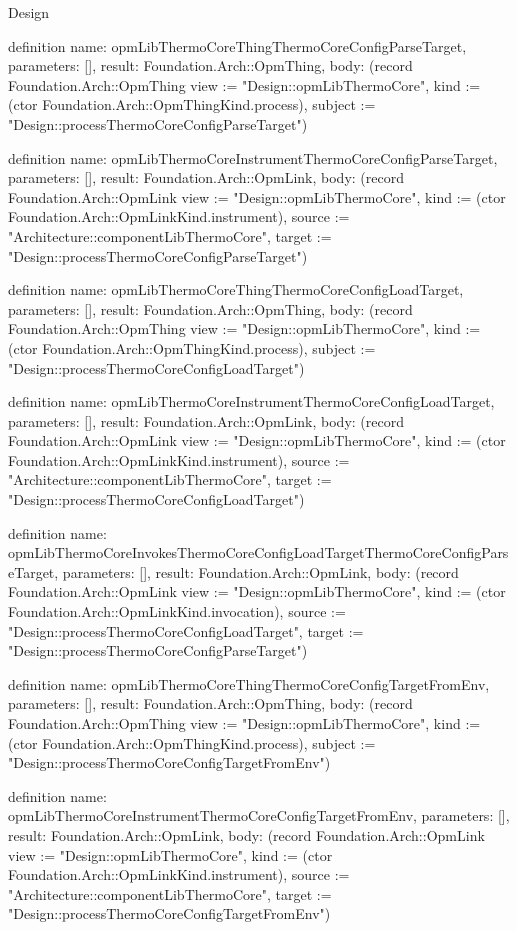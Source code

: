 \begin{lexlean}{Design}
\begin{semanticmodule}
definition{
  name: opmLibThermoCoreThingThermoCoreConfigParseTarget,
  parameters: [],
  result: Foundation.Arch::OpmThing,
  body: (record Foundation.Arch::OpmThing {view := "Design::opmLibThermoCore", kind := (ctor Foundation.Arch::OpmThingKind.process), subject := "Design::processThermoCoreConfigParseTarget"})
}

definition{
  name: opmLibThermoCoreInstrumentThermoCoreConfigParseTarget,
  parameters: [],
  result: Foundation.Arch::OpmLink,
  body: (record Foundation.Arch::OpmLink {view := "Design::opmLibThermoCore", kind := (ctor Foundation.Arch::OpmLinkKind.instrument), source := "Architecture::componentLibThermoCore", target := "Design::processThermoCoreConfigParseTarget"})
}

definition{
  name: opmLibThermoCoreThingThermoCoreConfigLoadTarget,
  parameters: [],
  result: Foundation.Arch::OpmThing,
  body: (record Foundation.Arch::OpmThing {view := "Design::opmLibThermoCore", kind := (ctor Foundation.Arch::OpmThingKind.process), subject := "Design::processThermoCoreConfigLoadTarget"})
}

definition{
  name: opmLibThermoCoreInstrumentThermoCoreConfigLoadTarget,
  parameters: [],
  result: Foundation.Arch::OpmLink,
  body: (record Foundation.Arch::OpmLink {view := "Design::opmLibThermoCore", kind := (ctor Foundation.Arch::OpmLinkKind.instrument), source := "Architecture::componentLibThermoCore", target := "Design::processThermoCoreConfigLoadTarget"})
}

definition{
  name: opmLibThermoCoreInvokesThermoCoreConfigLoadTargetThermoCoreConfigParseTarget,
  parameters: [],
  result: Foundation.Arch::OpmLink,
  body: (record Foundation.Arch::OpmLink {view := "Design::opmLibThermoCore", kind := (ctor Foundation.Arch::OpmLinkKind.invocation), source := "Design::processThermoCoreConfigLoadTarget", target := "Design::processThermoCoreConfigParseTarget"})
}

definition{
  name: opmLibThermoCoreThingThermoCoreConfigTargetFromEnv,
  parameters: [],
  result: Foundation.Arch::OpmThing,
  body: (record Foundation.Arch::OpmThing {view := "Design::opmLibThermoCore", kind := (ctor Foundation.Arch::OpmThingKind.process), subject := "Design::processThermoCoreConfigTargetFromEnv"})
}

definition{
  name: opmLibThermoCoreInstrumentThermoCoreConfigTargetFromEnv,
  parameters: [],
  result: Foundation.Arch::OpmLink,
  body: (record Foundation.Arch::OpmLink {view := "Design::opmLibThermoCore", kind := (ctor Foundation.Arch::OpmLinkKind.instrument), source := "Architecture::componentLibThermoCore", target := "Design::processThermoCoreConfigTargetFromEnv"})
}


\end{semanticmodule}
\end{lexlean}

